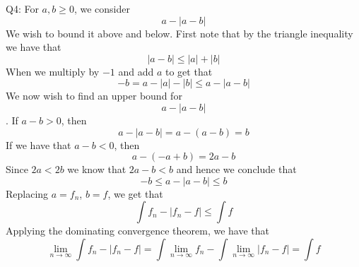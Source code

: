 \documentclass[letterpaper]{article}
\begin{document}
\noindent
Q4: For $a,b\geq 0$, we consider $$a- |a-b|$$
We wish to bound it above and below. First note that by the triangle inequality we have that $$|a-b| \leq |a| + |b|$$ When we multiply by $-1$ and add $a$ to get that $$-b=a - |a| - |b| \leq a-|a-b|$$ 
We now wish to find an upper bound for $$a - |a-b|$$. If $a-b>0$, then $$a-|a-b| = a-(a-b) =b$$
If we have that $a-b<0$, then $$a-(-a+b) = 2a-b$$ Since $2a<2b$ we know that $2a-b <b$ and hence we conclude that $$ - b \leq a - |a-b|\leq b$$
Replacing $a = f_n$, $b = f$, we get that $$\int f_n - |f_n -f| \leq \int f$$
Applying the dominating convergence theorem, we have that $$\lim_{n\to \infty} \int f_n - |f_n - f| = \int \lim_{n \to \infty} f_n - \int \lim_{n \to \infty} |f_n - f| = \int f$$
\end{document}

